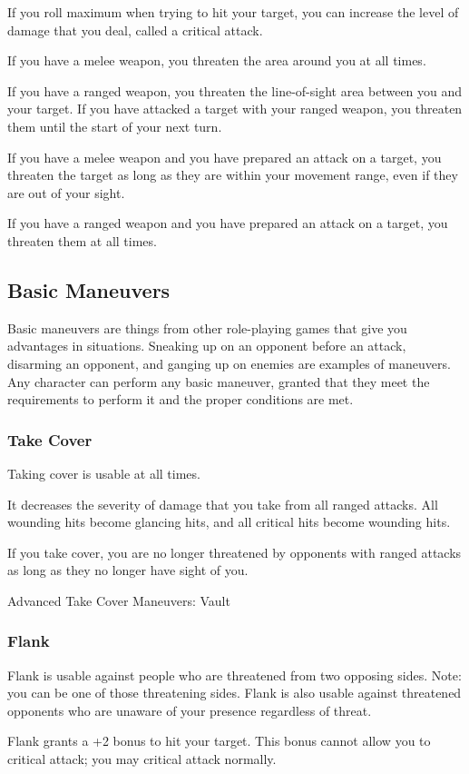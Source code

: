 \documentclass{article}
\begin{document}
If you roll maximum when trying to hit your target, you can increase the level of damage that you deal, called a critical attack.

If you have a melee weapon, you threaten the area around you at all times.

If you have a ranged weapon, you threaten the line-of-sight area between you and your target. If you have attacked a target with your ranged weapon, you threaten them until the start of your next turn.

If you have a melee weapon and you have prepared an attack on a target, you threaten the target as long as they are within your movement range, even if they are out of your sight.

If you have a ranged weapon and you have prepared an attack on a target, you threaten them at all times.
\subsection{Basic Maneuvers}
Basic maneuvers are things from other role-playing games that give you
advantages in situations. Sneaking up on an opponent before an attack,
disarming an opponent, and ganging up on enemies are examples of maneuvers. Any
character can perform any basic maneuver, granted that they meet the
requirements to perform it and the proper conditions are met.
\subsubsection{Take Cover}
Taking cover is usable at all times.

It decreases the severity of damage that you take from all ranged attacks. All wounding hits become glancing hits, and all critical hits become wounding hits.

If you take cover, you are no longer threatened by opponents with ranged attacks as long as they no longer have sight of you.

Advanced Take Cover Maneuvers: Vault
\subsubsection{Flank}
Flank is usable against people who are threatened from two opposing sides. Note: you can be one of those threatening sides. Flank is also usable against threatened opponents who are unaware of your presence regardless of threat.

Flank grants a +2 bonus to hit your target. This bonus cannot allow you to critical attack; you may critical attack normally.
\end{document}
